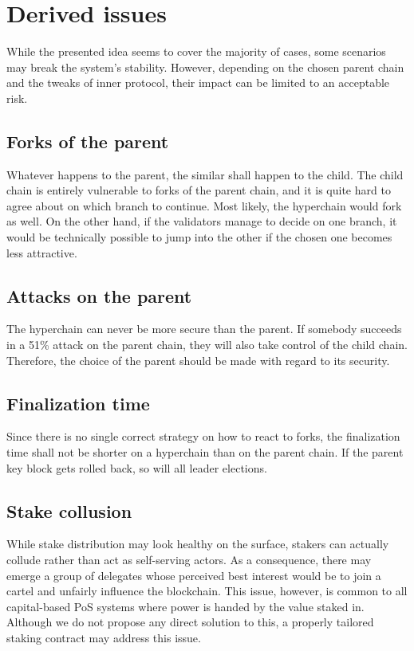 \section{Derived issues}

While the presented idea seems to cover the majority of cases, some scenarios
may break the system's stability. However, depending on the chosen parent chain
and the tweaks of inner protocol, their impact can be limited to an acceptable
risk.

\subsection{Forks of the parent}

Whatever happens to the parent, the similar shall happen to the child. The child
chain is entirely vulnerable to forks of the parent chain, and it is quite hard
to agree about on which branch to continue. Most likely, the hyperchain would
fork as well. On the other hand, if the validators manage to decide on one
branch, it would be technically possible to jump into the other if the chosen
one becomes less attractive.

\subsection{Attacks on the parent}

The hyperchain can never be more secure than the parent. If somebody succeeds in
a 51\% attack on the parent chain, they will also take control of the child
chain. Therefore, the choice of the parent should be made with regard to its
security.

\subsection{Finalization time}

Since there is no single correct strategy on how to react to forks, the
finalization time shall not be shorter on a hyperchain than on the parent chain.
If the parent key block gets rolled back, so will all leader elections.

\subsection{Stake collusion}

While stake distribution may look healthy on the surface, stakers can actually
collude rather than act as self-serving actors. As a consequence, there may
emerge a group of delegates whose perceived best interest would be to join a
cartel and unfairly influence the blockchain. This issue, however, is common to
all capital-based PoS systems where power is handed by the value staked in.
Although we do not propose any direct solution to this, a properly tailored
staking contract may address this issue.
